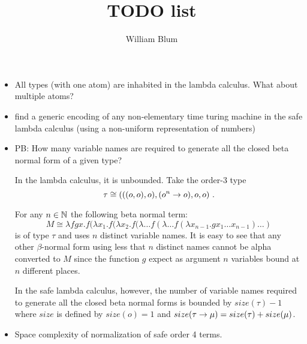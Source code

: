 \documentclass{article}
\title{TODO list}
\author{William Blum}
\begin{document}
\maketitle
\begin{itemize}
\item All types (with one atom) are inhabited in the lambda
calculus. What about multiple atoms?

\item find a generic encoding of any non-elementary time turing machine
in the safe lambda calculus (using a non-uniform representation of
numbers)

\item PB: How many variable names are required to generate all the
closed beta normal form of a given type?

In the lambda calculus, it is unbounded. Take the order-3 type
$$\tau
\cong (((o,o),o), (o^n\rightarrow o), o, o) \ . $$

For any $n\in\mathbb{N}$ the following beta normal term:
$$ M \cong \lambda f g x . f (\lambda x_1.f(\lambda x_2.f(\lambda \ldots f(\lambda \ldots f(\lambda x_{n-1}.g x_1 \ldots x_{n-1}) \ldots )$$
is of type $\tau$ and uses $n$ distinct variable names. It is easy to see that
any other $\beta$-normal form using less that $n$ distinct names cannot be alpha converted to $M$
since the function $g$ expect as argument $n$ variables bound at $n$ different places.


In the safe lambda calculus, however, the number of variable names
required to generate all the closed beta normal forms is bounded by
$size(\tau)-1$ where $size$ is defined by $size(o)= 1$ and
$size(\tau\rightarrow\mu) = size(\tau) + size(\mu)$.

\item Space complexity of normalization of safe order 4 terms.
\end{itemize}
\end{document}
